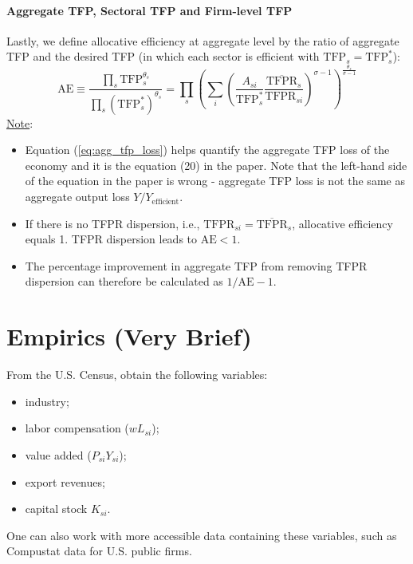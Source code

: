 \documentclass[12pt]{article}
\begin{document}
\paragraph{Aggregate TFP, Sectoral TFP and Firm-level TFP \\ [6pt]}
	Lastly, we define allocative efficiency at aggregate level by the ratio of aggregate TFP and the desired TFP (in which each sector is efficient with $\text{TFP}_s = \text{TFP}_s^*$):
	\begin{equation} \label{eq:agg_tfp_loss}
		\text{AE}
		\equiv \frac{\prod_s \text{TFP}_s^{\theta_s}}{\prod_s (\text{TFP}_s^*)^{\theta_s}} 
		= \prod_s \left(\sum_i \left(\frac{A_{si}}{\text{TFP}^*_s}\frac{\overline{\text{TFPR}}_s}{\text{TFPR}_{si}}\right)^{\sigma -1}\right)^{\frac{\theta_s}{\sigma-1}}
	\end{equation}
\underline{Note}:
\begin{itemize}
	\item Equation (\ref{eq:agg_tfp_loss}) helps quantify the aggregate TFP loss of the economy and it is the equation (20) in the paper. Note that the left-hand side of the equation in the paper is wrong - aggregate TFP loss is not the same as aggregate output loss $Y/Y_{\text{efficient}}$. 
		\item If there is no TFPR dispersion, i.e., $\text{TFPR}_{si} = \overline{\text{TFPR}}_s$, allocative efficiency equals 1. TFPR dispersion leads to $\text{AE}<1$. 
		\item The percentage improvement in aggregate TFP from removing TFPR dispersion can therefore be calculated as $1/\text{AE} -1$.
\end{itemize}
	
	
	\section{Empirics (Very Brief)}
		From the U.S. Census, obtain the following variables:
	\begin{itemize}
		\item industry;
		\item labor compensation ($wL_{si}$);
		\item value added ($P_{si}Y_{si}$);
			\item export revenues;
		\item capital stock $K_{si}$.
	\end{itemize}
		One can also work with more accessible data containing these variables, such as Compustat data for U.S. public firms.
	
\end{document}
